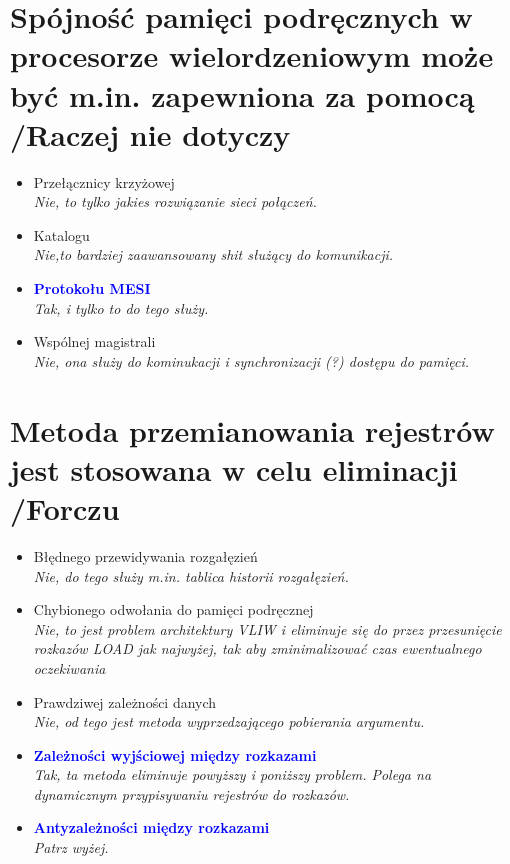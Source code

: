 \documentclass[a4paper,twoside]{article}
\begin{document}
\section{Spójność pamięci podręcznych w procesorze wielordzeniowym może być m.in. zapewniona za pomocą {\small /Raczej nie dotyczy}}
	\begin{itemize}
    \item Przełącznicy krzyżowej\\
    {\small \emph{Nie, to tylko jakies rozwiązanie sieci połączeń.}}
    \item Katalogu\\
    {\small \emph{Nie,to bardziej zaawansowany shit służący do komunikacji.}}
    \item \textcolor{Blue}{\textbf{Protokołu MESI}}\\
    {\small \emph{Tak, i tylko to do tego służy.}}
    \item Wspólnej magistrali\\
    {\small \emph{Nie, ona służy do kominukacji i synchronizacji (?) dostępu do pamięci.}}
    \end{itemize}

\section{Metoda przemianowania rejestrów jest stosowana w celu eliminacji {\small /Forczu}}
	\begin{itemize}
    \item Błędnego przewidywania rozgałęzień\\
    {\small \emph{Nie, do tego służy m.in. tablica historii rozgałęzień.}}
    \item Chybionego odwołania do pamięci podręcznej\\
    {\small \emph{Nie, to jest problem architektury VLIW i eliminuje się do przez przesunięcie rozkazów LOAD jak najwyżej, tak aby zminimalizować czas ewentualnego oczekiwania}}
    \item Prawdziwej zależności danych\\
    {\small \emph{Nie, od tego jest metoda wyprzedzającego pobierania argumentu.}}
    \item \textcolor{Blue}{\textbf{Zależności wyjściowej między rozkazami}}\\
    {\small \emph{Tak, ta metoda eliminuje powyższy i poniższy problem. Polega na dynamicznym przypisywaniu rejestrów do rozkazów.}}
    \item \textcolor{Blue}{\textbf{Antyzależności między rozkazami}}\\
    {\small \emph{Patrz wyżej.}}
    
    \end{itemize}
\end{document}
